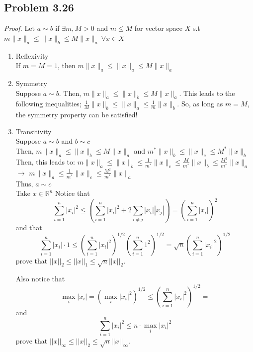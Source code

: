 \documentclass[letterpaper,12pt]{article}
\theoremstyle{definition}
\begin{document}
\begin{spacing}{1.3}{}
\subsection*{Problem 3.26}
\emph{Proof.} Let $a \sim b$ if $\exists m,M > 0$ and $m \leq M$ for vector space $X$ s.t $m \|x\|_{a} \leq \|x\|_{b} \leq M \|x\|_{a} \ \forall x \in X$ \
\begin{enumerate}
    \item 
    Reflexivity\\
	If $m = M = 1$, then $m \|x\|_{a} \leq \|x\|_{a} \leq M \|x\|_{a}$ \
	\item
	Symmetry \\
	Suppose $a \sim b$. Then, $m \|x\|_{a} \leq \|x\|_{b} \leq M \|x\|_{a}$. This leads to the following inequalities; $\frac{1}{M} \|x\|_{b} \leq \|x\|_{a} \leq \frac{1}{m} \|x\|_{b}$. So, as long as $m=M$, the symmetry property can be satisfied! \
	\item
	Transitivity \\
	Suppose $a \sim b$ and $b \sim c$ \\
	Then, $m \|x\|_{a} \leq \|x\|_{b} \leq M \|x\|_{a}$ and $m^* \|x\|_{b} \leq \|x\|_{c} \leq M^* \|x\|_{b}$ \\
	Then, this leads to: $m \|x\|_{a} \leq \|x\|_{b} \leq \frac{1}{m^*} \|x\|_{c} \leq \frac{M}{m^*} \|x\|_b \leq \frac{M^2}{m^*} \|x\|_a$ $\rightarrow$ $m \|x\|_{a} \leq \frac{1}{m^*}\|x\|_{c} \leq \frac{M^2}{m^*} \|x\|_{a}$ \\
	Thus, $a \sim c$ \\
	Take $x\in\mathbb R^n$
	Notice that
	\begin{equation*}
	\sum_{i=1}^n|x_i|^2\leq
	\left(\sum_{i=1}^n|x_i|^2+2\sum_{i\neq j}|x_i||x_j|\right)=
	\left(\sum_{i=1}^n|x_i|\right)^2
	\end{equation*}
	and that
	\begin{equation*}
	\sum_{i=1}^n|x_i|\cdot1\leq
	\left(\sum_{i=1}^n|x_i|^2\right)^{1/2}\left(\sum_{i=1}^n1^2\right)^{1/2}=
	\sqrt{n}\left(\sum_{i=1}^n|x_i|^2\right)^{1/2}
	\end{equation*}
	prove that $||x||_2\leq||x||_1\leq\sqrt{n}||x||_2$.
	
	Also notice that
	\begin{equation*}
	\max_{i}|x_i|=\left(\max_i|x_i|^2\right)^{1/2}\leq
	\left(\sum_{i=1}^n|x_i|^2\right)^{1/2}=
	\end{equation*}
	and
	\begin{equation*}
	\sum_{i=1}^n|x_i|^2\leq n\cdot\max_i|x_i|^2
	\end{equation*}
	prove that $||x||_\infty\leq||x||_2\leq \sqrt{n}||x||_\infty$. \\
	

\end{enumerate}
\end{spacing}
\end{document}
